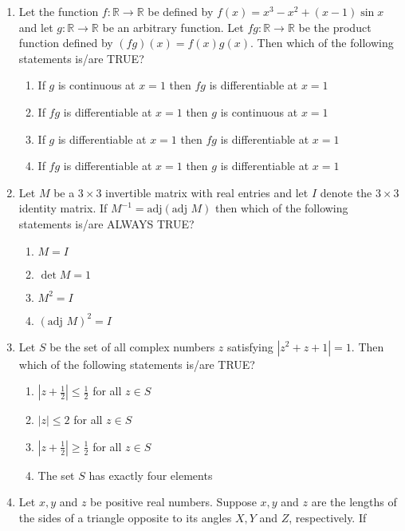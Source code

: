\documentclass{article}
\begin{document}
\begin{enumerate}
\item  Let the function $f: \mathbb{R} \to \mathbb{R}$ be defined by $f(x) = x^3 - x^2 + (x - 1) \sin x$ and let $g: \mathbb{R} \to \mathbb{R}$ be an arbitrary function. Let $fg: \mathbb{R} \to \mathbb{R}$ be the product function defined by $(fg)(x) = f(x)g(x)$. Then which of the following statements is/are TRUE?

    \begin{enumerate}
        \item  If $g$ is continuous at $x = 1$ then $fg$ is differentiable at $x = 1$
        \item  If $fg$ is differentiable at $x = 1$ then $g$ is continuous at $x = 1$
        \item  If $g$ is differentiable at $x = 1$ then $fg$ is differentiable at $x = 1$
        \item  If $fg$ is differentiable at $x = 1$ then $g$ is differentiable at $x = 1$
    \end{enumerate}

\item  Let $M$ be a $3 \times 3$ invertible matrix with real entries and let $I$ denote the $3 \times 3$ identity matrix. If $ M^{-1} = \text{adj}(\text{adj } M)$ then which of the following statements is/are ALWAYS TRUE?

    \begin{enumerate}
        \item  $M = I$
        \item  $\det M = 1$
        \item  $M^2 = I$
        \item  $(\text{adj } M)^2 = I$
    \end{enumerate}
\item  Let $S$ be the set of all complex numbers $z$ satisfying $|z^2 + z + 1| = 1$. Then which of the following statements is/are TRUE?

    \begin{enumerate}
        \item  $|z + \frac{1}{2}| \leq \frac{1}{2}$ for all $z \in S$
        \item  $|z| \leq 2$ for all $z \in S$
        \item  $|z + \frac{1}{2}| \geq \frac{1}{2}$ for all $z \in S$
        \item  The set $S$ has exactly four elements
    \end{enumerate}

\item  Let $x, y$ and $z$ be positive real numbers. Suppose $x, y$ and $z$ are the lengths of the sides of a triangle opposite to its angles $X, Y$ and $Z$, respectively. If 


\end{enumerate}
\end{document}
